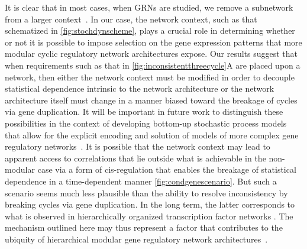 It is clear that in most cases, when GRNs are studied, we remove a subnetwork from a larger context~\cite{Alon2007}. In our case, the network context, such as that schematized in \ref{fig:stochdynscheme}, plays a crucial role in determining whether or not it is possible to impose selection on the gene expression patterns that more modular cyclic regulatory network architectures expose. Our results suggest that when requirements such as that in \ref{fig:inconsistentthreecycle}A are placed upon a network, then either the network context must be modified in order to decouple statistical dependence intrinsic to the network architecture or the network architecture itself must change in a manner biased toward the breakage of cycles via gene duplication. It will be important in future work to distinguish these possibilities in the context of developing bottom-up stochastic process models that allow for the explicit encoding and solution of models of more complex gene regulatory networks~\cite{Walczak2009,Mugler2009}. It is possible that the network context may lead to apparent access to correlations that lie outside what is achievable in the non-modular case via a form of cis-regulation that enables the breakage of statistical dependence in a time-dependent manner \ref{fig:condgenescenario}. But such a scenario seems much less plausible than the ability to resolve inconsistency by breaking cycles via gene duplication. In the long term, the latter corresponds to what is observed in hierarchically organized transcription factor networks \cite{Jothi2009,Bhardwaj2010,Chalancon2012,Colm}. The mechanism outlined here may thus represent a factor that contributes to the ubiquity of hierarchical modular gene regulatory network architectures~\cite{Ravasz2002,Segre2005,Wagner2007,Erwin2009,Jothi2009,Bhardwaj2010,Colm}.

